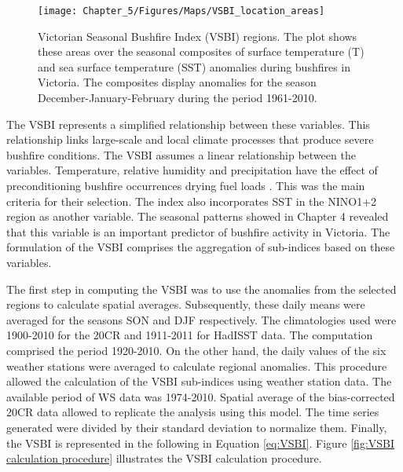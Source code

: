 \begin{figure}[h]
\noindent \begin{centering}
\texttt{[image: Chapter\_5/Figures/Maps/VSBI\_location\_areas]}
\par\end{centering}

\caption[Victorian Seasonal Bushfire Index (VSBI) regions]{Victorian Seasonal Bushfire Index (VSBI) regions. The plot shows these
areas over the seasonal composites of surface temperature (T) and
sea surface temperature (SST) anomalies during bushfires in Victoria.
The composites display anomalies for the season December-January-February
during the period 1961-2010. \label{fig: Victorian Seasonal Bushfire Index (VSBI) regions}}


\end{figure}


The VSBI represents a simplified relationship between these variables.
This relationship links large-scale and local climate processes that
produce severe bushfire conditions. The VSBI assumes a linear relationship
between the variables. Temperature, relative humidity and precipitation
have the effect of preconditioning bushfire occurrences drying fuel
loads \citep{BoM2009}. This was the main criteria for their selection.
The index also incorporates SST in the NINO1+2 region as another variable.
The seasonal patterns showed in Chapter 4 revealed that this variable
is an important predictor of bushfire activity in Victoria. The formulation
of the VSBI comprises the aggregation of sub-indices based on these
variables. 

The first step in computing the VSBI was to use the anomalies from
the selected regions to calculate spatial averages. Subsequently,
these daily means were averaged for the seasons SON and DJF respectively.
The climatologies used were 1900-2010 for the 20CR and 1911-2011 for
HadISST data. The computation comprised the period 1920-2010. On the
other hand, the daily values of the six weather stations were averaged
to calculate regional anomalies. This procedure allowed the calculation of
the VSBI sub-indices using weather station data. The available period
of WS data was 1974-2010. Spatial average of the bias-corrected
20CR data allowed to replicate the analysis using this model. The
time series generated were divided by their standard deviation to
normalize them. Finally, the VSBI is represented in the following
in Equation \ref{eq:VSBI}. Figure \ref{fig:VSBI calculation procedure}
illustrates the VSBI calculation procedure.

